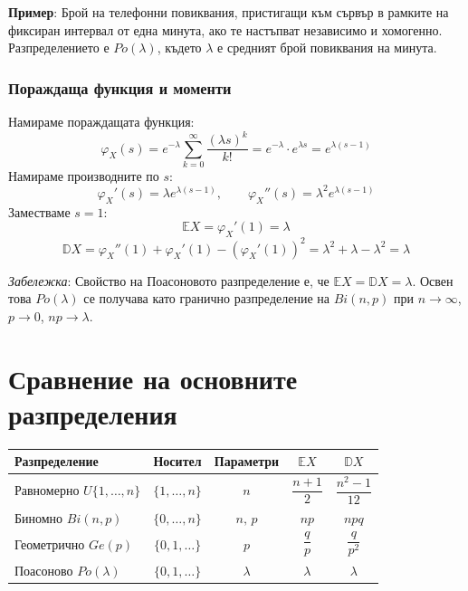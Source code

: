 \documentclass{scrartcl}
\begin{document}
\begin{FlushLeft}
\textbf{Пример}: Брой на телефонни повиквания, пристигащи към сървър в рамките на фиксиран интервал от една минута, ако те настъпват независимо и хомогенно. Разпределението е $Po(\lambda)$, където $\lambda$ е средният брой повиквания на минута.

\subsubsection{Пораждаща функция и моменти}
Намираме пораждащата функция:
\[ \varphi_X(s) = e^{-\lambda} \sum_{k=0}^{\infty} \frac{(\lambda s)^k}{k!} = e^{-\lambda} \cdot e^{\lambda s} = e^{\lambda(s - 1)} \]
Намираме производните по $s$:
\[ \varphi_X'(s) = \lambda e^{\lambda(s-1)}, \qquad \varphi_X''(s) = \lambda^2 e^{\lambda(s-1)} \]
Заместваме $s = 1$:
\[ \mathbb{E}X = \varphi_X'(1) = \lambda \]
\[ \mathbb{D}X = \varphi_X''(1) + \varphi_X'(1) - (\varphi_X'(1))^2 = \lambda^2 + \lambda - \lambda^2 = \lambda \]

\textit{Забележка}: Свойство на Поасоновото разпределение е, че $\mathbb{E}X = \mathbb{D}X = \lambda$. Освен това $Po(\lambda)$ се получава като гранично разпределение на $Bi(n, p)$ при $n \to \infty$, $p \to 0$, $np \to \lambda$.

\section{Сравнение на основните разпределения}

\begin{center}
\begin{tabular}{|l|c|c|c|c|}
  \hline
  \textbf{Разпределение} & \textbf{Носител} & \textbf{Параметри} & $\mathbb{E}X$ & $\mathbb{D}X$ \\
  \hline
  Равномерно $U\{1,\dots,n\}$ & $\{1,\dots,n\}$ & $n$ & $\dfrac{n+1}{2}$ & $\dfrac{n^2-1}{12}$ \\[8pt]
  Биномно $Bi(n,p)$ & $\{0,\dots,n\}$ & $n,\,p$ & $np$ & $npq$ \\[4pt]
  Геометрично $Ge(p)$ & $\{0,1,\dots\}$ & $p$ & $\dfrac{q}{p}$ & $\dfrac{q}{p^2}$ \\[8pt]
  Поасоново $Po(\lambda)$ & $\{0,1,\dots\}$ & $\lambda$ & $\lambda$ & $\lambda$ \\[4pt]
  \hline
\end{tabular}
\end{center}

\end{FlushLeft}
\end{document}
